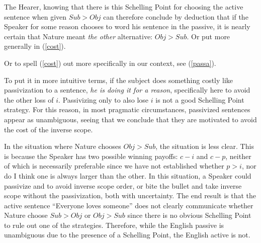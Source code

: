 \documentclass{article}
\begin{document}
The Hearer, knowing that there is this Schelling Point for choosing the active sentence when given ${Sub}>{Obj}$ can therefore conclude by deduction that if the Speaker for some reason chooses to word his sentence in the passive, it is nearly certain that Nature meant \emph{the other} alternative: ${Obj}>{Sub}$.
Or put more generally in (\ref{cost}).

\begin{exe}
\end{exe}



Or to spell (\ref{cost}) out more specifically in our context, see (\ref{passa}).


\begin{exe}
\end{exe}

To put it in more intuitive terms, if the subject does something costly like passivization to a sentence, \emph{he is doing it for a reason}, specifically here to avoid the other loss of $i$.
Passivizing only to also lose $i$ is not a good Schelling Point strategy.
For this reason, in most pragmatic circumstances, passivized sentences appear as unambiguous, seeing that we conclude that they are motivated to avoid the cost of the inverse scope.

In the situation where Nature chooses ${Obj}>{Sub}$, the situation is less clear.
This is because the Speaker has two possible winning payoffs: $c-i$ and $c-p$, neither of which is necessarily preferable since we have not established whether $p>i$, nor do I think one is always larger than the other.
In this situation, a Speaker could passivize and to avoid inverse scope order, or bite the bullet and take inverse scope without the passivization, both with uncertainty.
The end result is that the active sentence ``Everyone loves someone'' does not clearly communicate whether Nature choose ${Sub}>{Obj}$ or ${Obj}>{Sub}$ since there is no obvious Schelling Point to rule out one of the strategies.
Therefore, while the English passive is unambiguous due to the presence of a Schelling Point, the English active is not.
\end{document}
